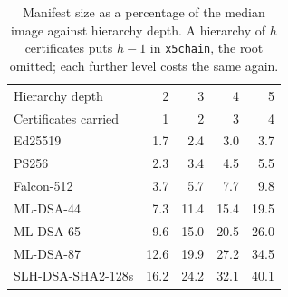 \begin{table}[ht]
\caption{Manifest size as a percentage of the median image against hierarchy depth. A hierarchy of $h$ certificates puts $h-1$ in \texttt{x5chain}, the root omitted; each further level costs the same again.}
\label{tab:chaindepth}
\small
\begin{tabular}{lrrrr}
\toprule
Hierarchy depth & 2 & 3 & 4 & 5\\
Certificates carried & 1 & 2 & 3 & 4\\
\midrule
Ed25519 & 1.7 & 2.4 & 3.0 & 3.7\\
PS256 & 2.3 & 3.4 & 4.5 & 5.5\\
Falcon-512 & 3.7 & 5.7 & 7.7 & 9.8\\
ML-DSA-44 & 7.3 & 11.4 & 15.4 & 19.5\\
ML-DSA-65 & 9.6 & 15.0 & 20.5 & 26.0\\
ML-DSA-87 & 12.6 & 19.9 & 27.2 & 34.5\\
SLH-DSA-SHA2-128s & 16.2 & 24.2 & 32.1 & 40.1\\
\bottomrule
\end{tabular}
\end{table}
